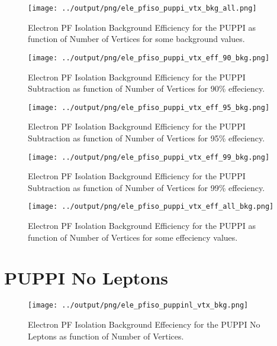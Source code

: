 \documentclass[11pt]{book}
\begin{document}
\begin{figure}[htb]
\centering
\texttt{[image: ../output/png/ele\_pfiso\_puppi\_vtx\_bkg\_all.png]}
\caption{Electron PF Isolation Background Efficiency for the PUPPI as function of Number of Vertices for some background values.}
\label{fig:ele_pfiso_vtx_bkg_puppi_bkg_all}
\end{figure}

\begin{figure}[htb]
\centering
\texttt{[image: ../output/png/ele\_pfiso\_puppi\_vtx\_eff\_90\_bkg.png]}
\caption{Electron PF Isolation Background Efficiency for the PUPPI Subtraction as function of Number of Vertices for 90\% effeciency.}
\label{fig:ele_pfiso_vtx_eff_puppi_eff_90_bkg}
\end{figure}

\begin{figure}[htb]
\centering
\texttt{[image: ../output/png/ele\_pfiso\_puppi\_vtx\_eff\_95\_bkg.png]}
\caption{Electron PF Isolation Background Efficiency for the PUPPI Subtraction as function of Number of Vertices for 95\% effeciency.}
\label{fig:ele_pfiso_vtx_eff_puppi_eff_95_bkg}
\end{figure}

\begin{figure}[htb]
\centering
\texttt{[image: ../output/png/ele\_pfiso\_puppi\_vtx\_eff\_99\_bkg.png]}
\caption{Electron PF Isolation Background Efficiency for the PUPPI Subtraction as function of Number of Vertices for 99\% effeciency.}
\label{fig:ele_pfiso_vtx_eff_puppi_eff_99_bkg}
\end{figure}

\begin{figure}[htb]
\centering
\texttt{[image: ../output/png/ele\_pfiso\_puppi\_vtx\_eff\_all\_bkg.png]}
\caption{Electron PF Isolation Background Efficiency for the PUPPI as function of Number of Vertices for some effeciency values.}
\label{fig:ele_pfiso_vtx_eff_puppi_eff_all_bkg}
\end{figure}
\clearpage

\section{PUPPI No Leptons}
\begin{figure}[htb]
\centering
\texttt{[image: ../output/png/ele\_pfiso\_puppinl\_vtx\_bkg.png]}
\caption{Electron PF Isolation Background Effeciency for the PUPPI No Leptons as function of Number of Vertices.}
\label{fig:ele_pfiso_vtx_bkg_puppinl}
\end{figure}
\end{document}
